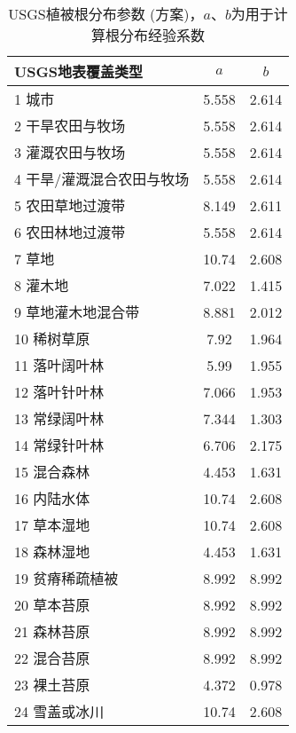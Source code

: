 \begin{table}[htbp]
  \centering
  \caption[USGS植被根分布参数 (\citet{zeng2001global}方案)]{USGS植被根分布参数 (\citet{zeng2001global}方案)，$a$、$b$为用于计算根分布经验系数}
  \label{tab:USGS植被根分布参数}
  \begin{tabular}{@{}lcc@{}}
    \toprule
    USGS地表覆盖类型          & $a$   & $b$   \\ \midrule
    1 城市                    & 5.558 & 2.614 \\
    2 干旱农田与牧场          & 5.558 & 2.614 \\
    3 灌溉农田与牧场          & 5.558 & 2.614 \\
    4 干旱/灌溉混合农田与牧场 & 5.558 & 2.614 \\
    5 农田草地过渡带          & 8.149 & 2.611 \\
    6 农田林地过渡带          & 5.558 & 2.614 \\
    7 草地                    & 10.74 & 2.608 \\
    8 灌木地                  & 7.022 & 1.415 \\
    9 草地灌木地混合带        & 8.881 & 2.012 \\
    10 稀树草原               & 7.92  & 1.964 \\
    11 落叶阔叶林             & 5.99  & 1.955 \\
    12 落叶针叶林             & 7.066 & 1.953 \\
    13 常绿阔叶林             & 7.344 & 1.303 \\
    14 常绿针叶林             & 6.706 & 2.175 \\
    15 混合森林               & 4.453 & 1.631 \\
    16 内陆水体               & 10.74 & 2.608 \\
    17 草本湿地               & 10.74 & 2.608 \\
    18 森林湿地               & 4.453 & 1.631 \\
    19 贫瘠稀疏植被           & 8.992 & 8.992 \\
    20 草本苔原               & 8.992 & 8.992 \\
    21 森林苔原               & 8.992 & 8.992 \\
    22 混合苔原               & 8.992 & 8.992 \\
    23 裸土苔原               & 4.372 & 0.978 \\
    24 雪盖或冰川             & 10.74 & 2.608 \\ \bottomrule
  \end{tabular}
\end{table}


